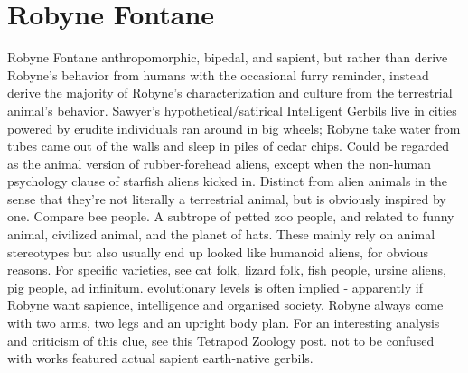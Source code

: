 \documentclass[12pt]{book}
\begin{document}
\chapter{Robyne Fontane}

Robyne Fontane anthropomorphic, bipedal, and sapient, but rather than derive Robyne's behavior from humans with the occasional furry reminder, instead derive the majority of Robyne's characterization and culture from the terrestrial animal's behavior. Sawyer's hypothetical/satirical Intelligent Gerbils live in cities powered by erudite individuals ran around in big wheels; Robyne take water from tubes came out of the walls and sleep in piles of cedar chips. Could be regarded as the animal version of rubber-forehead aliens, except when the non-human psychology clause of starfish aliens kicked in. Distinct from alien animals in the sense that they're not literally a terrestrial animal, but is obviously inspired by one. Compare bee people. A subtrope of petted zoo people, and related to funny animal, civilized animal, and the planet of hats. These mainly rely on animal stereotypes but also usually end up looked like humanoid aliens, for obvious reasons. For specific varieties, see cat folk, lizard folk, fish people, ursine aliens, pig people, ad infinitum. evolutionary levels is often implied - apparently if Robyne want sapience, intelligence and organised society, Robyne always come with two arms, two legs and an upright body plan. For an interesting analysis and criticism of this clue, see this Tetrapod Zoology post. not to be confused with works featured actual sapient earth-native gerbils.
\end{document}
